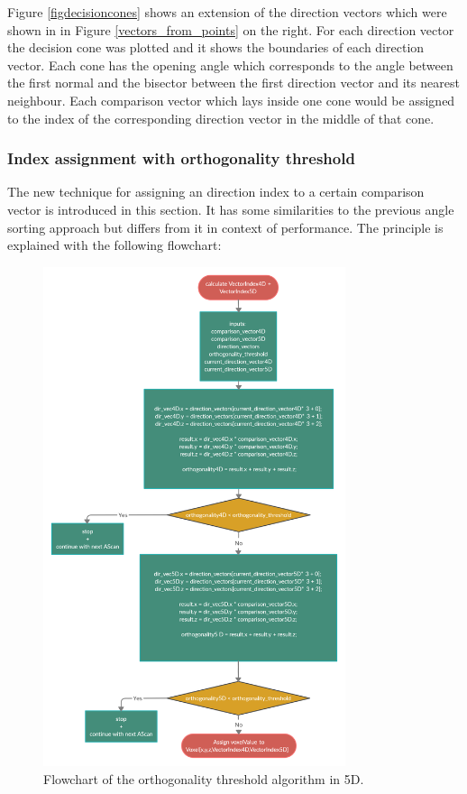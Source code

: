 Figure \ref{figdecisioncones} shows an extension of the direction vectors which were shown in in Figure \ref{vectors_from_points} on the right. For each direction vector the decision cone was plotted and it shows the boundaries of each direction vector. Each cone has the opening angle which corresponds to the angle between the first normal and the bisector between the first direction vector and its nearest neighbour. Each comparison vector which lays inside one cone would be assigned to the index of the corresponding direction vector in the middle of that cone.

\subsubsection{Index assignment with orthogonality threshold}

The new technique for assigning an direction index to a certain comparison vector is introduced in this section. It has some similarities to the previous angle sorting approach but differs from it in context of performance. The principle is explained with the following flowchart:

\begin{figure}[H]
    \centering
    \includegraphics[width=0.79\textwidth]{Graphics/Fringe_Orthogonality.png}
    \caption{Flowchart of the orthogonality threshold algorithm in 5D.}
    \label{ortho_threshold_flow}
\end{figure}

